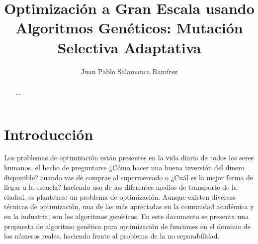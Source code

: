 \documentclass{llncs}
\begin{document}
\title{Optimización a Gran Escala usando Algoritmos Genéticos: Mutación Selectiva Adaptativa}
%
%
\author{Juan Pablo Salamanca Ramírez}
%
%
\tocauthor{}
%

\maketitle

\begin{abstract}
...
\end{abstract}
%

\section{Introducción}
Los problemas de optimización están presentes en la vida diaria de todos los seres humanos, el hecho de preguntarse ¿Cómo hacer una buena inversión del dinero disponible? cuando vas de compras al supermercado o ¿Cuál es la mejor forma de llegar a la escuela? haciendo uso de los diferentes medios de transporte de la ciudad, es plantearse un problema de optimización. Aunque existen diversas técnicas de optimización, una de las más apreciadas en la comunidad académica y en la industria, son los algoritmos genéticos. En este documento se presenta una propuesta de algoritmo genético para optimización de funciones en el dominio de los números reales, haciendo frente al problema de la no separabilidad.

\end{document}
